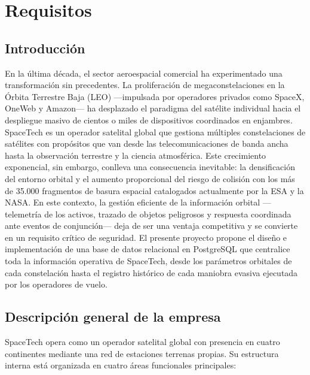 \chapter{Requisitos}

\section{Introducción}

En la última década, el sector aeroespacial comercial ha experimentado una transformación sin precedentes. La proliferación de megaconstelaciones en la Órbita Terrestre Baja (LEO) —impulsada por operadores privados como SpaceX, OneWeb y Amazon— ha desplazado el paradigma del satélite individual hacia el despliegue masivo de cientos o miles de dispositivos coordinados en enjambres. SpaceTech es un operador satelital global que gestiona múltiples constelaciones de satélites con propósitos que van desde las telecomunicaciones de banda ancha hasta la observación terrestre y la ciencia atmosférica. Este crecimiento exponencial, sin embargo, conlleva una consecuencia inevitable: la densificación del entorno orbital y el aumento proporcional del riesgo de colisión con los más de 35.000 fragmentos de basura espacial catalogados actualmente por la ESA y la NASA. En este contexto, la gestión eficiente de la información orbital —telemetría de los activos, trazado de objetos peligrosos y respuesta coordinada ante eventos de conjunción— deja de ser una ventaja competitiva y se convierte en un requisito crítico de seguridad. El presente proyecto propone el diseño e implementación de una base de datos relacional en PostgreSQL que centralice toda la información operativa de SpaceTech, desde los parámetros orbitales de cada constelación hasta el registro histórico de cada maniobra evasiva ejecutada por los operadores de vuelo.

\section{Descripción general de la empresa}

SpaceTech opera como un operador satelital global con presencia en cuatro continentes mediante una red de estaciones terrenas propias. Su estructura interna está organizada en cuatro áreas funcionales principales:

